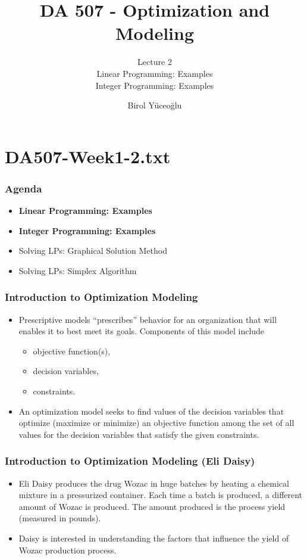 \documentclass[11pt]{beamer}
\author{Birol Yüceoğlu}
\title{DA 507 - Optimization and Modeling}
\subtitle{Lecture 2 \\ Linear Programming: Examples \\ Integer Programming: Examples}
\institute{Migros T.A.Ş.}
\begin{document}
\begin{frame}
\titlepage
\end{frame}


\section{DA507-Week1-2.txt}

\begin{frame}
\frametitle{Agenda}
\begin{itemize}
\item \textbf{Linear Programming: Examples}
\item \textbf{Integer Programming: Examples}
\item Solving LPs: Graphical Solution Method
\item Solving LPs: Simplex Algorithm
\end{itemize}

\end{frame}


\begin{frame}
\frametitle{Introduction to Optimization Modeling}
\begin{itemize}
\item Prescriptive models “prescribes” behavior for an organization that will enables it to best meet its goals.  Components of this model include
\begin{itemize}
\item objective function(s),
\item decision variables,
\item constraints.
\end{itemize}
\item An optimization model seeks to find values of the decision variables that optimize (maximize or minimize) an objective function among the set of all values for the decision variables that satisfy the given constraints.
\end{itemize}

\end{frame}



\begin{frame}
\frametitle{Introduction to Optimization Modeling (Eli Daisy)}
\begin{itemize}
\item<1-> Eli Daisy produces the drug Wozac in huge batches by heating a chemical mixture in a pressurized container.  Each time a batch is produced, a different amount of Wozac is produced. The amount produced is the process yield  (measured in pounds).
\item<1-> Daisy is interested in understanding the factors that influence the yield of Wozac production process.
\end{itemize}
\end{frame}
\end{document}
